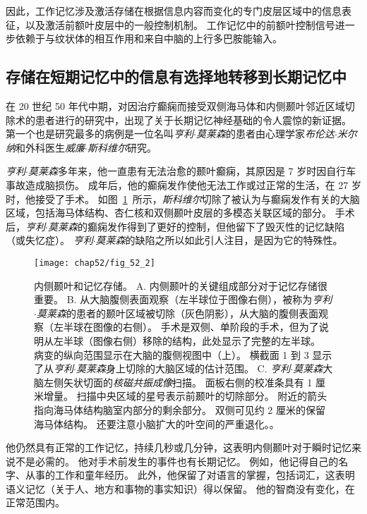 因此，工作记忆涉及激活存储在根据信息内容而变化的专门皮层区域中的信息表征，以及激活前额叶皮层中的一般控制机制。
工作记忆中的前额叶控制信号进一步依赖于与纹状体的相互作用和来自中脑的上行多巴胺能输入。



\subsection{存储在短期记忆中的信息有选择地转移到长期记忆中}

在 20 世纪 50 年代中期，对因治疗癫痫而接受双侧海马体和内侧颞叶邻近区域切除术的患者进行的研究中，出现了关于长期记忆神经基础的令人震惊的新证据。
第一个也是研究最多的病例是一位名叫\textit{亨利$\cdot$莫莱森}的患者由心理学家\textit{布伦达$\cdot$米尔纳}和外科医生\textit{威廉$\cdot$斯科维尔}研究。


\textit{亨利$\cdot$莫莱森}多年来，他一直患有无法治愈的颞叶癫痫，其原因是 7 岁时因自行车事故造成脑损伤。
成年后，他的癫痫发作使他无法工作或过正常的生活，在 27 岁时，他接受了手术。
如图~\ref{fig:52_2}~所示，\textit{斯科维尔}切除了被认为与癫痫发作有关的大脑区域，包括海马体结构、杏仁核和双侧颞叶皮层的多模态关联区域的部分。
手术后，\textit{亨利$\cdot$莫莱森}的癫痫发作得到了更好的控制，但他留下了毁灭性的记忆缺陷（或失忆症）。
\textit{亨利$\cdot$莫莱森}的缺陷之所以如此引人注目，是因为它的特殊性。


\begin{figure}[htbp]
	\centering
	\texttt{[image: chap52/fig\_52\_2]}
	\caption{内侧颞叶和记忆存储。
		A. 内侧颞叶的关键组成部分对于记忆存储很重要。
		B. 从大脑腹侧表面观察（左半球位于图像右侧），被称为\textit{亨利$\cdot$莫莱森}的患者的颞叶区域被切除（灰色阴影），从大脑的腹侧表面观察（左半球在图像的右侧）。
		手术是双侧、单阶段的手术，但为了说明从左半球（图像右侧）移除的结构，此处显示了完整的左半球。
		病变的纵向范围显示在大脑的腹侧视图中（上）。
		横截面 1 到 3 显示了从\textit{亨利$\cdot$莫莱森}身上切除的大脑区域的估计范围\cite{corkin1997hm}。
		C. \textit{亨利$\cdot$莫莱森}大脑左侧矢状切面的\textit{核磁共振成像}扫描。
		面板右侧的校准条具有 1 厘米增量。
		扫描中央区域的星号表示前颞叶的切除部分。
		附近的箭头指向海马体结构脑室内部分的剩余部分。
		双侧可见约 2 厘米的保留海马体结构。
		还要注意小脑扩大的叶空间的严重退化。\cite{corkin1997hm}。}
	\label{fig:52_2}
\end{figure}


他仍然具有正常的工作记忆，持续几秒或几分钟，这表明内侧颞叶对于瞬时记忆来说不是必需的。
他对手术前发生的事件也有长期记忆。
例如，他记得自己的名字、从事的工作和童年经历。
此外，他保留了对语言的掌握，包括词汇，这表明语义记忆（关于人、地方和事物的事实知识）得以保留。
他的智商没有变化，在正常范围内。


